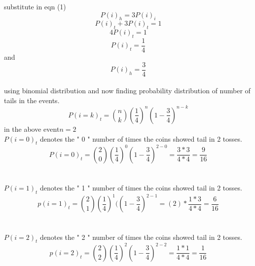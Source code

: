 \documentclass[journal,12pt,twocolumn]{IEEEtran}
\begin{document}
substitute in eqn (1)$$P(i)_h=3P(i)_i $$ 
$$P(i)_t+3P(i)_t=1$$
$$4P(i)_t=1$$
$$ P(i)_t=\frac{1}{4}$$
and $$P(i)_h=\frac{3}{4}$$\\
  using  binomial distribution and now finding  probability distribution of number of tails in the events.\\
$$ P(i=k)_t={n \choose k}( \frac{1}{4})^{n} (1-\frac{3}{4}) ^{n-k}$$
in the above event$ n=2$\\
$P(i=0)_t $ denotes the " 0 " number of times the coins showed tail in 2 tosses.\\
$$ P(i=0)_t={2 \choose 0}( \frac{1}{4})^{0} (1-\frac{3}{4}) ^{2-0}=\frac{3*3}{4*4}=\frac{9}{16}$$\\
\\$P(i=1)_t $ denotes the " 1 " number of times the coins showed tail in 2 tosses.\\
$$p(i=1)_t={2 \choose 1}(\frac{1}{4} )^{1} ((1-\frac{3}{4}) ^{2-1}=(2)*{\frac{1*3}{4*4}}=\frac{6}{16}$$\\
\\$P(i=2)_t $ denotes the " 2 " number of times the coins showed tail in 2 tosses.\\
$$p(i=2)_t={2 \choose 2}( \frac{1}{4})^{2} (1-\frac{3}{4}) ^{2-2}=\frac{1*1}{4*4}=\frac{1}{16}$$\\
\end{document}
